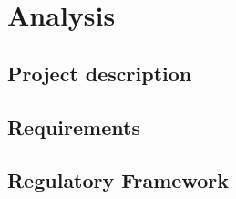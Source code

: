 \chapter{Analysis}\label{chap:analysis}



\section{Project description}



\section{Requirements}



\section{Regulatory Framework}
